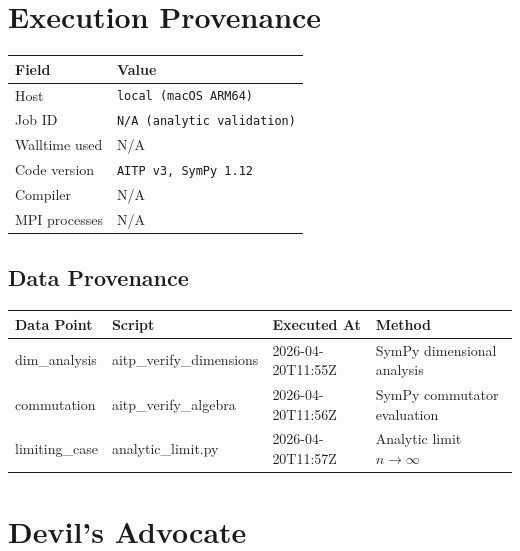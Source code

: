 \documentclass[11pt,a4paper]{article}
\begin{document}
\section{Execution Provenance}

\begin{infobox}
\begin{tabularx}{\linewidth}{@{}>{\raggedright\arraybackslash}p{3.5cm} >{\raggedright\arraybackslash}X@{}}
\toprule
\textbf{Field} & \textbf{Value} \\
\midrule
Host            & \texttt{local (macOS ARM64)} \\
Job ID          & \texttt{N/A (analytic validation)} \\
Walltime used   & N/A \\
Code version    & \texttt{AITP v3, SymPy 1.12} \\
Compiler        & N/A \\
MPI processes   & N/A \\
\bottomrule
\end{tabularx}
\end{infobox}

\subsection{Data Provenance}

\begin{longtable}{>{\raggedright}p{2.5cm} p{3cm} p{2cm} p{4.5cm}}
\toprule
\textbf{Data Point} & \textbf{Script} & \textbf{Executed At} & \textbf{Method} \\
\midrule
\endhead
dim\_analysis & aitp\_verify\_dimensions & 2026-04-20T11:55Z & SymPy dimensional analysis \\
commutation   & aitp\_verify\_algebra    & 2026-04-20T11:56Z & SymPy commutator evaluation \\
limiting\_case & analytic\_limit.py       & 2026-04-20T11:57Z & Analytic limit $n\to\infty$ \\
\bottomrule
\end{longtable}

\section{Devil's Advocate}
\end{document}

